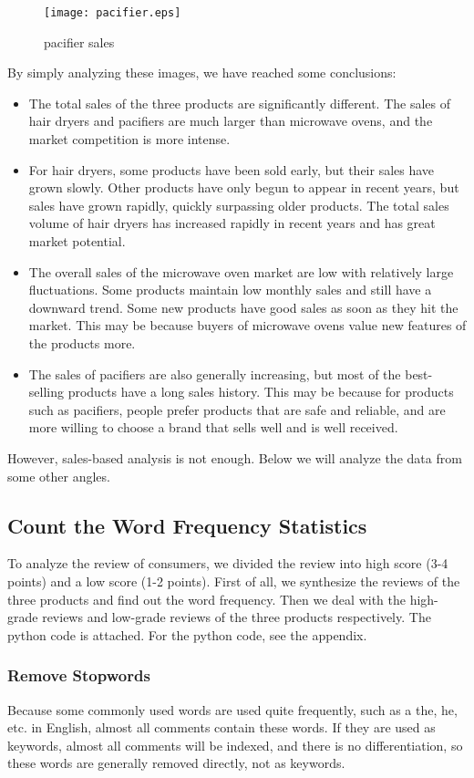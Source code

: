 \documentclass{mcmthesis}
\begin{document}
	\begin{figure}[H]
		\small
		\centering
		\texttt{[image: pacifier.eps]}
		\caption{pacifier sales} \label{pacifier sales}
	\end{figure}
	
	By simply analyzing these images, we have reached some conclusions:
	\begin{itemize}
		\item
		The total sales of the three products are significantly different. The sales of hair dryers and pacifiers are much larger than microwave ovens, and the market competition is more intense.
		\item
		For hair dryers, some products have been sold early, but their sales have grown slowly. Other products have only begun to appear in recent years, but sales have grown rapidly, quickly surpassing older products. The total sales volume of hair dryers has increased rapidly in recent years and has great market potential.
		\item
		The overall sales of the microwave oven market are low with relatively large fluctuations. Some products maintain low monthly sales and still have a downward trend. Some new products have good sales as soon as they hit the market. This may be because buyers of microwave ovens value new features of the products more.
		\item
		The sales of pacifiers are also generally increasing, but most of the best-selling products have a long sales history. This may be because for products such as pacifiers, people prefer products that are safe and reliable, and are more willing to choose a brand that sells well and is well received.
	\end{itemize}
	
	However, sales-based analysis is not enough. Below we will analyze the data from some other angles.
	
	\subsection{Count the Word Frequency Statistics}
	To analyze the review of consumers, we divided the review into high score (3-4 points) and a low score (1-2 points). First of all, we synthesize the reviews of the three products and find out the word frequency. Then we deal with the high-grade reviews and low-grade reviews of the three products respectively. The python code is attached. For the python code, see the appendix.
	\subsubsection{Remove Stopwords}
	Because some commonly used words are used quite frequently, such as a the, he, etc. in English, almost all comments contain these words. If they are used as keywords, almost all comments will be indexed, and there is no differentiation, so these words are generally removed directly, not as keywords.
	
\end{document}
